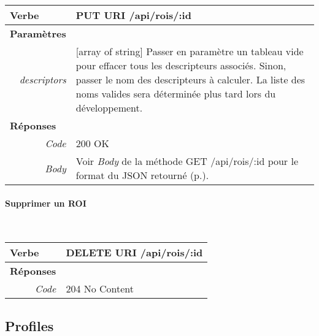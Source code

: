 \begin{appendices}
\begin{absolutelynopagebreak}
\begin{tabular}{@{}p{2cm}p{11.5cm}@{}}
    \toprule
    \textbf{Verbe}                        & PUT \hspace{2.5cm} \textbf{URI} \hspace{0.25cm} /api/rois/:id   \\ \midrule
    \textbf{Paramètres}                   &        \\
    \multicolumn{1}{r}{\textit{descriptors}} & [array of string] Passer en paramètre un tableau vide pour effacer tous les descripteurs associés.
    Sinon, passer le nom des descripteurs à calculer.
    La liste des noms valides sera déterminée plus tard lors du développement. \\\midrule
    \textbf{Réponses}                     &        \\
    \multicolumn{1}{r}{\textit{Code}}   & 200 OK \\
    \multicolumn{1}{r}{\textit{Body}}   & Voir \emph{Body} de la méthode GET /api/rois/:id pour le format du JSON retourné (p.\pageref{jsonHalROIs}).
    \\ \bottomrule
\end{tabular}
\end{absolutelynopagebreak}

\begin{absolutelynopagebreak}
\paragraph{Supprimer un ROI}
~

\begin{tabular}{@{}p{2cm}p{11.5cm}@{}}
    \toprule
    \textbf{Verbe}                        & DELETE \hspace{2.5cm} \textbf{URI} \hspace{0.25cm} /api/rois/:id   \\ \midrule
    \textbf{Réponses}                     &        \\
    \multicolumn{1}{r}{\textit{Code}}   & 204 No Content \\ \bottomrule
\end{tabular}
\end{absolutelynopagebreak}


\begin{absolutelynopagebreak}
\section{Profiles}


\end{absolutelynopagebreak}
\end{appendices}

